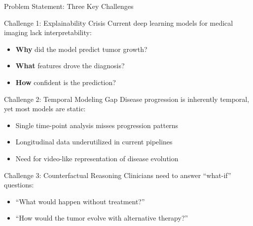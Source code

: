 \documentclass[aspectratio=169]{beamer}
\begin{document}
\begin{frame}{Problem Statement: Three Key Challenges}
    \begin{block}{Challenge 1: Explainability Crisis}
        Current deep learning models for medical imaging lack interpretability:
        \begin{itemize}
            \item \textbf{Why} did the model predict tumor growth?
            \item \textbf{What} features drove the diagnosis?
            \item \textbf{How} confident is the prediction?
        \end{itemize}
    \end{block}
    
    \begin{block}{Challenge 2: Temporal Modeling Gap}
        Disease progression is inherently temporal, yet most models are static:
        \begin{itemize}
            \item Single time-point analysis misses progression patterns
            \item Longitudinal data underutilized in current pipelines
            \item Need for video-like representation of disease evolution
        \end{itemize}
    \end{block}
    
    \begin{block}{Challenge 3: Counterfactual Reasoning}
        Clinicians need to answer ``what-if'' questions:
        \begin{itemize}
            \item ``What would happen without treatment?''
            \item ``How would the tumor evolve with alternative therapy?''
        \end{itemize}
    \end{block}
\end{frame}
\end{document}
